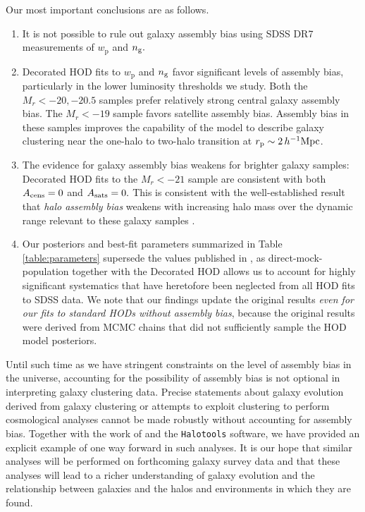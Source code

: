 \documentclass[usenatbib,usegraphicx,letterpaper]{mn2e}
\newcommand{\wprp}{w_{\mathrm{p}}}
\newcommand{\magr}{M_r}
\newcommand{\ben}{\begin{enumerate}}
\newcommand{\een}{\end{enumerate}}
\begin{document}
Our most important conclusions are as follows.
%
\ben
%
\item It is not possible to rule out galaxy assembly bias using SDSS DR7 measurements of $\wprp$ and $n_{\rm g}.$
%
\item Decorated HOD fits to $\wprp$ and $n_{\rm g}$ favor significant levels of assembly bias, particularly in the lower luminosity thresholds we study. Both the $\magr<-20, -20.5$ samples prefer relatively strong central galaxy assembly bias. The $\magr<-19$ sample favors satellite assembly bias. Assembly bias in these samples improves the capability of the model to describe galaxy clustering near
the one-halo to two-halo transition at $r_{\rm p} \sim 2 \, h^{-1}\mathrm{Mpc}$.
%
\item The evidence for galaxy assembly bias weakens for brighter galaxy samples: Decorated HOD fits to the $\magr<-21$ sample are consistent with both $A_{\rm cens}=0$ and $A_{\rm sats}=0.$ This is consistent with the well-established result that
{\em halo assembly bias} weakens with increasing halo mass over the dynamic range relevant to these galaxy samples
\citep[see, e.g., Figure 8 of][and references therein]{hearin_etal16}.
%
\item Our posteriors and best-fit parameters summarized in
Table \ref{table:parameters} supersede the values published in \citet{zehavi_etal11},
as direct-mock-population together with the Decorated HOD allows us to account for
highly significant systematics that have heretofore been neglected from all HOD fits to SDSS data.
We note that our findings update the original \citet{zehavi_etal11} results
{\em even for our fits to standard HODs without assembly bias}, because
the original results were derived from MCMC chains that did not sufficiently sample the HOD model posteriors.
%
\een
%

Until such time as we have stringent constraints on the level of assembly bias in the 
universe, accounting for the possibility of assembly bias is not optional in interpreting 
galaxy clustering data. Precise statements about galaxy evolution derived from 
galaxy clustering or attempts to exploit clustering to perform cosmological analyses 
cannot be made robustly without accounting for assembly bias. Together with 
the work of \citet{hearin_etal16} and the {\tt Halotools} software, we have provided 
an explicit example of one way forward in such analyses. It is our hope that similar analyses 
will be performed on forthcoming galaxy survey data and that these analyses will lead to a
richer understanding of galaxy evolution and the relationship between galaxies and the halos 
and environments in which they are found.
\end{document}
